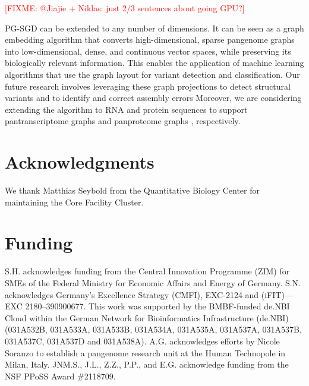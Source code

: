 \documentclass{bioinfo}
\theoremstyle{definition}
\newcommand{\red}[1]{{\textcolor{Red}{#1}}}
\newcommand{\FIXME}[1]{\red{[FIXME: #1]}}
\begin{document}
	\FIXME{@Jiajie + Niklas: just 2/3 sentences about going GPU?}

	PG-SGD can be extended to any number of dimensions.
	It can be seen as a graph embedding algorithm that converts high-dimensional, sparse pangenome graphs into low-dimensional, dense, and continuous vector spaces, while preserving its biologically relevant information.
	This enables the application of machine learning algorithms that use the graph layout for variant detection and classification. 
	Our future research involves leveraging these graph projections to detect structural variants and to identify and correct assembly errors
	Moreover, we are considering extending the algorithm to RNA and protein sequences to support pantranscriptome graphs \citep{sibbesen_haplotype-aware_2023} and panproteome graphs \citep{dabbaghie_panpa:_2023}, respectively.

	\section*{Acknowledgments}
	
	We thank Matthias Seybold from the Quantitative Biology Center for maintaining the Core Facility Cluster.
	
	\section*{Funding}
	
	S.H. acknowledges funding from the Central Innovation Programme (ZIM) for SMEs of the Federal Ministry for Economic Affairs and Energy of Germany.
	S.N. acknowledges Germany’s Excellence Strategy (CMFI), EXC-2124 and (iFIT)—EXC 2180–390900677.
	This work was supported by the BMBF-funded de.NBI Cloud within the German Network for Bioinformatics Infrastructure (de.NBI) (031A532B, 031A533A, 031A533B, 031A534A, 031A535A, 031A537A, 031A537B, 031A537C, 031A537D and 031A538A).
	A.G. acknowledges efforts by Nicole Soranzo to establish a pangenome research unit at the Human Technopole in Milan, Italy.
	JNM.S., J.L., Z.Z., P.P., and E.G. acknowledge funding from the NSF PPoSS Award \#2118709.
	
\end{document}
